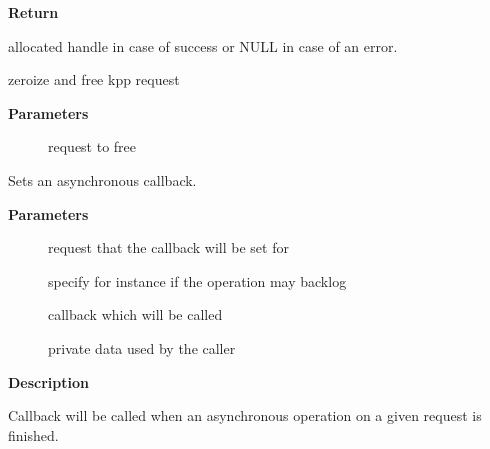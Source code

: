 \documentclass[a4paper,8pt,english]{sphinxmanual}
\begin{document}
\textbf{Return}

allocated handle in case of success or NULL in case of an error.

\begin{fulllineitems}
\label{crypto/api-kpp:c.kpp_request_free}
zeroize and free kpp request

\end{fulllineitems}


\textbf{Parameters}
\begin{description}
\item[{}] \leavevmode
request to free

\end{description}

\begin{fulllineitems}
\label{crypto/api-kpp:c.kpp_request_set_callback}
Sets an asynchronous callback.

\end{fulllineitems}


\textbf{Parameters}
\begin{description}
\item[{}] \leavevmode
request that the callback will be set for

\item[{}] \leavevmode
specify for instance if the operation may backlog

\item[{}] \leavevmode
callback which will be called

\item[{}] \leavevmode
private data used by the caller

\end{description}

\textbf{Description}

Callback will be called when an asynchronous operation on a given
request is finished.
\end{document}
